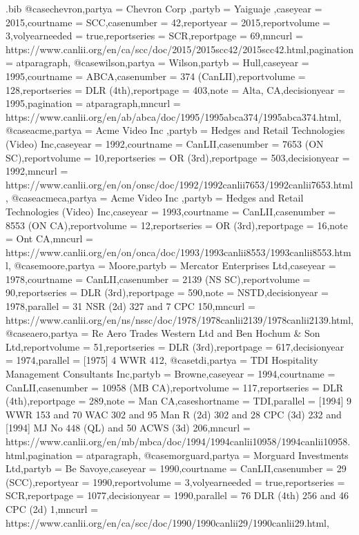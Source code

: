 \begin{filecontents*}[overwrite]{\jobname.bib}
@case{chevron,partya = {Chevron Corp },partyb = {Yaiguaje },caseyear = {2015},courtname = {SCC},casenumber = {42},reportyear = {2015},reportvolume = {3},volyearneeded = {true},reportseries = {SCR},reportpage = {69},mncurl = {https://www.canlii.org/en/ca/scc/doc/2015/2015scc42/2015scc42.html},pagination = {atparagraph},}
@case{wilson,partya = {Wilson},partyb = {Hull},caseyear = {1995},courtname = {ABCA},casenumber = {374 (CanLII)},reportvolume = {128},reportseries = {DLR (4th)},reportpage = {403},note = {Alta, CA},decisionyear = {1995},pagination = {atparagraph},mncurl = {https://www.canlii.org/en/ab/abca/doc/1995/1995abca374/1995abca374.html},}
@case{acme,partya = {Acme Video Inc },partyb = {Hedges and Retail Technologies (Video) Inc},caseyear = {1992},courtname = {CanLII},casenumber = {7653 (ON SC)},reportvolume = {10},reportseries = {OR (3rd)},reportpage = {503},decisionyear = {1992},mncurl = {https://www.canlii.org/en/on/onsc/doc/1992/1992canlii7653/1992canlii7653.html},}
@case{acmeca,partya = {Acme Video Inc },partyb = {Hedges and Retail Technologies (Video) Inc},caseyear = {1993},courtname = {CanLII},casenumber = {8553 (ON CA)},reportvolume = {12},reportseries = {OR (3rd)},reportpage = {16},note = {Ont CA},mncurl = {https://www.canlii.org/en/on/onca/doc/1993/1993canlii8553/1993canlii8553.html},}
@case{moore,partya = {Moore},partyb = {Mercator Enterprises Ltd},caseyear = {1978},courtname = {CanLII},casenumber = {2139 (NS SC)},reportvolume = {90},reportseries = {DLR (3rd)},reportpage = {590},note = {NSTD},decisionyear = {1978},parallel = {31 NSR (2d) 327 and 7 CPC 150},mncurl = {https://www.canlii.org/en/ns/nssc/doc/1978/1978canlii2139/1978canlii2139.html},}
@case{aero,partya = {Re Aero Trades Western Ltd and Ben Hochum \& Son Ltd},reportvolume = {51},reportseries = {DLR (3rd)},reportpage = {617},decisionyear = {1974},parallel = {[1975] 4 WWR 412},}
@case{tdi,partya = {TDI Hospitality Management Consultants Inc},partyb = {Browne},caseyear = {1994},courtname = {CanLII},casenumber = {10958 (MB CA)},reportvolume = {117},reportseries = {DLR (4th)},reportpage = {289},note = {Man CA},caseshortname = {TDI},parallel = {[1994] 9 WWR 153 and 70 WAC 302 and 95 Man R (2d) 302 and 28 CPC (3d) 232 and [1994] MJ No 448 (QL) and 50 ACWS (3d) 206},mncurl = {https://www.canlii.org/en/mb/mbca/doc/1994/1994canlii10958/1994canlii10958.html},pagination = {atparagraph},}
@case{morguard,partya = {Morguard Investments Ltd},partyb = {Be Savoye},caseyear = {1990},courtname = {CanLII},casenumber = {29 (SCC)},reportyear = {1990},reportvolume = {3},volyearneeded = {true},reportseries = {SCR},reportpage = {1077},decisionyear = {1990},parallel = {76 DLR (4th) 256 and 46 CPC (2d) 1},mncurl = {https://www.canlii.org/en/ca/scc/doc/1990/1990canlii29/1990canlii29.html},}

\end{filecontents*}
